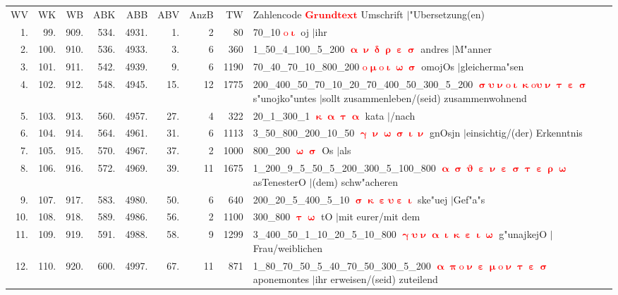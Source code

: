 \documentclass[a4paper,10pt,landscape]{article}
\begin{document}
\begin{tabular}{rrrrrrrrp{120mm}}
WV&WK&WB&ABK&ABB&ABV&AnzB&TW&Zahlencode \textcolor{red}{$\boldsymbol{Grundtext}$} Umschrift $|$"Ubersetzung(en)\\
1.&99.&909.&534.&4931.&1.&2&80&70\_10 \textcolor{red}{$\boldsymbol{\mathrm{o}\upiota}$} oj $|$ihr\\
2.&100.&910.&536.&4933.&3.&6&360&1\_50\_4\_100\_5\_200 \textcolor{red}{$\boldsymbol{\upalpha\upnu\updelta\uprho\upepsilon\upsigma}$} andres $|$M"anner\\
3.&101.&911.&542.&4939.&9.&6&1190&70\_40\_70\_10\_800\_200 \textcolor{red}{$\boldsymbol{\mathrm{o}\upmu\mathrm{o}\upiota\upomega\upsigma}$} omojOs $|$gleicherma"sen\\
4.&102.&912.&548.&4945.&15.&12&1775&200\_400\_50\_70\_10\_20\_70\_400\_50\_300\_5\_200 \textcolor{red}{$\boldsymbol{\upsigma\upsilon\upnu\mathrm{o}\upiota\upkappa\mathrm{o}\upsilon\upnu\uptau\upepsilon\upsigma}$} s"unojko"untes $|$sollt zusammenleben/(seid) zusammenwohnend\\
5.&103.&913.&560.&4957.&27.&4&322&20\_1\_300\_1 \textcolor{red}{$\boldsymbol{\upkappa\upalpha\uptau\upalpha}$} kata $|$/nach\\
6.&104.&914.&564.&4961.&31.&6&1113&3\_50\_800\_200\_10\_50 \textcolor{red}{$\boldsymbol{\upgamma\upnu\upomega\upsigma\upiota\upnu}$} gnOsjn $|$einsichtig/(der) Erkenntnis\\
7.&105.&915.&570.&4967.&37.&2&1000&800\_200 \textcolor{red}{$\boldsymbol{\upomega\upsigma}$} Os $|$als\\
8.&106.&916.&572.&4969.&39.&11&1675&1\_200\_9\_5\_50\_5\_200\_300\_5\_100\_800 \textcolor{red}{$\boldsymbol{\upalpha\upsigma\upvartheta\upepsilon\upnu\upepsilon\upsigma\uptau\upepsilon\uprho\upomega}$} asTenesterO $|$(dem) schw"acheren\\
9.&107.&917.&583.&4980.&50.&6&640&200\_20\_5\_400\_5\_10 \textcolor{red}{$\boldsymbol{\upsigma\upkappa\upepsilon\upsilon\upepsilon\upiota}$} ske"uej $|$Gef"a"s\\
10.&108.&918.&589.&4986.&56.&2&1100&300\_800 \textcolor{red}{$\boldsymbol{\uptau\upomega}$} tO $|$mit eurer/mit dem\\
11.&109.&919.&591.&4988.&58.&9&1299&3\_400\_50\_1\_10\_20\_5\_10\_800 \textcolor{red}{$\boldsymbol{\upgamma\upsilon\upnu\upalpha\upiota\upkappa\upepsilon\upiota\upomega}$} g"unajkejO $|$Frau/weiblichen\\
12.&110.&920.&600.&4997.&67.&11&871&1\_80\_70\_50\_5\_40\_70\_50\_300\_5\_200 \textcolor{red}{$\boldsymbol{\upalpha\uppi\mathrm{o}\upnu\upepsilon\upmu\mathrm{o}\upnu\uptau\upepsilon\upsigma}$} aponemontes $|$ihr erweisen/(seid) zuteilend\\

\end{tabular}
\end{document}
